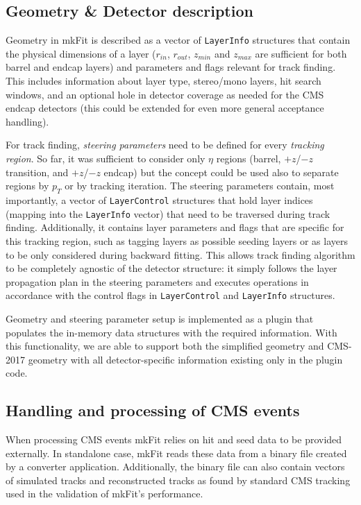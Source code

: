 \documentclass{webofc}
\def\mkfit{mkFit\xspace}
\def\stt#1{{\small\texttt{#1}}}
\begin{document}
\subsection{Geometry \& Detector description}

Geometry in \mkfit is described as a vector of \stt{LayerInfo} structures
that contain the physical dimensions of a layer ($r_{in}$, $r_{out}$, $z_{min}$
and $z_{max}$ are sufficient for both barrel and endcap layers) and parameters
and flags relevant for track finding. This includes information about layer
type, stereo/mono layers, hit search windows, and an optional hole in detector
coverage as needed for the CMS endcap detectors (this could be extended for
even more general acceptance handling).

For track finding, \emph{steering parameters} need to be defined for every
\emph{tracking region}. So far, it was sufficient to consider only $\eta$
regions (barrel, $+z$/$-z$ transition, and $+z$/$-z$ endcap) but the concept
could be used also to separate regions by $p_T$ or by tracking iteration. The
steering parameters contain, most importantly, a vector of \stt{LayerControl}
structures that hold layer indices (mapping into the \stt{LayerInfo} vector)
that need to be traversed during track finding. Additionally, it contains
layer parameters and flags that are specific for this tracking region, such as
tagging layers as possible seeding layers or as layers to be only considered
during backward fitting. This allows track finding algorithm to be completely
agnostic of the detector structure: it simply follows the layer propagation
plan in the steering parameters and executes operations in accordance with the
control flags in \stt{LayerControl} and \stt{LayerInfo} structures.

Geometry and steering parameter setup is implemented as a plugin that
populates the in-memory data structures with the required information. With this
functionality, we are able to support both the simplified geometry and
CMS-2017 geometry with all detector-specific information existing only in the
plugin code.

\subsection{Handling and processing of CMS events}
\label{ssec:cms-event-processing}

When processing CMS events \mkfit relies on hit and seed data to be provided
externally. In standalone case, \mkfit reads these data from a binary file
created by a converter application. Additionally, the binary file can also 
contain vectors of simulated tracks and reconstructed tracks as found by 
standard CMS tracking used in the validation of \mkfit's performance.
\end{document}
